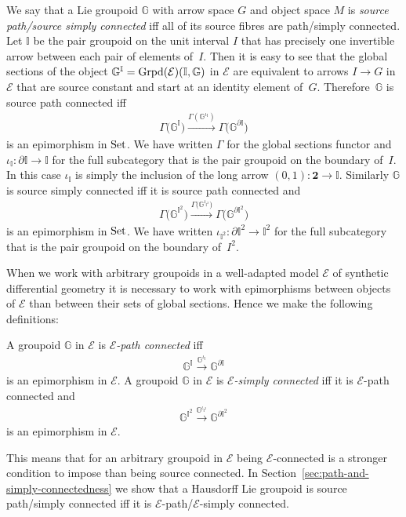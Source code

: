 \documentclass[10pt,a4paper]{amsart}
\numberwithin{equation}{section}
\begin{document}
We say that a Lie groupoid $\mathbb{G}$ with arrow space $G$ and object space $M$ is \emph{source path/source simply connected} if\/f all of its source f\/ibres are path/simply connected. Let $\mathbb{I}$ be the pair groupoid on the unit interval $I$ that has precisely one invertible arrow between each pair of elements of~$I$. Then it is easy to see that the global sections of the object $\mathbb{G}^{\mathbb{I}}= {\rm Grpd} (\mathcal{E})(\mathbb{I},\mathbb{G})$ in $\mathcal{E}$ are equivalent to arrows $I \rightarrow G$ in $\mathcal{E}$ that are source constant and start at an identity element of~$G$. Therefore~$\mathbb{G}$ is source path connected if\/f
\begin{gather*}\Gamma\big(\mathbb{G}^{\mathbb{I}}\big) \xrightarrow{\Gamma(\mathbb{G}^{\iota_{\mathbb{I}}})} \Gamma\big(\mathbb{G}^{\partial \mathbb{I}}\big)\end{gather*}
is an epimorphism in ${\rm Set}$. We have written $\Gamma$ for the global sections functor and $\iota_{\mathbb{I}}\colon \partial \mathbb{I} \rightarrow \mathbb{I}$ for the full subcategory that is the pair groupoid on the boundary of~$I$. In this case $\iota_{\mathbb{I}}$ is simply the inclusion of the long arrow $(0,1)\colon \mathbf 2 \rightarrow \mathbb{I}$. Similarly $\mathbb{G}$ is source simply connected if\/f it is source path connected and \begin{gather*}\Gamma\big(\mathbb{G}^{\mathbb{I}^2}\big) \xrightarrow{\Gamma\big(\mathbb{G}^{\iota_{\mathbb{I}^2}}\big)} \Gamma\big(\mathbb{G}^{\partial \mathbb{I}^2}\big)\end{gather*}
is an epimorphism in ${\rm Set}$. We have written $\iota_{\mathbb{I}^2}\colon \partial \mathbb{I}^2 \rightarrow \mathbb{I}^2$ for the full subcategory that is the pair groupoid on the boundary of~$I^2$.

When we work with arbitrary groupoids in a well-adapted model $\mathcal{E}$ of synthetic dif\/ferential geometry it is necessary to work with epimorphisms between objects of $\mathcal{E}$ than between their sets of global sections. Hence we make the following def\/initions:
\begin{Definition} A groupoid $\mathbb{G}$ in $\mathcal{E}$ is \emph{$\mathcal{E}$-path connected} if\/f
 \begin{gather*}\mathbb{G}^{\mathbb{I}} \xrightarrow{\mathbb{G}^{\iota_{\mathbb{I}}}} \mathbb{G}^{\partial \mathbb{I}}\end{gather*}
is an epimorphism in $\mathcal{E}$. A groupoid $\mathbb{G}$ in $\mathcal{E}$ is \emph{$\mathcal{E}$-simply connected} if\/f it is $\mathcal{E}$-path connected and
 \begin{gather*}\mathbb{G}^{\mathbb{I}^2} \xrightarrow{\mathbb{G}^{\iota_{\mathbb{I}^2}}} \mathbb{G}^{\partial \mathbb{I}^2}\end{gather*}
is an epimorphism in $\mathcal{E}$.
\end{Definition}
This means that for an arbitrary groupoid in $\mathcal{E}$ being $\mathcal{E}$-connected is a stronger condition to impose than being source connected. In Section~\ref{sec:path-and-simply-connectedness} we show that a Hausdorf\/f Lie groupoid is source path/simply connected if\/f it is $\mathcal{E}$-path/$\mathcal{E}$-simply connected.
\end{document}
